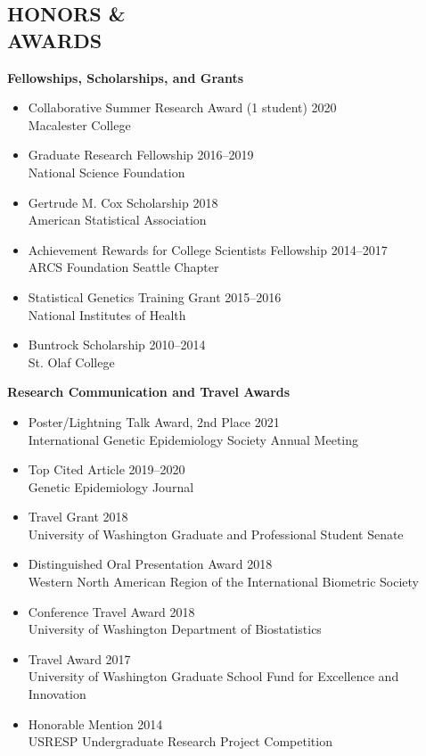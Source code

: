 \documentclass[margin]{res}
\begin{document}
\begin{resume}
					
\section{HONORS \& \\ AWARDS}

\textbf{Fellowships, Scholarships, and Grants}
\begin{itemize}
\item Collaborative Summer Research Award (1 student) \hfill 2020 \\
Macalester College
\item Graduate Research Fellowship \hfill 2016--2019 \\
National Science Foundation  
\item Gertrude M. Cox Scholarship \hfill 2018 \\ American Statistical Association
\item Achievement Rewards for College Scientists Fellowship \hfill 2014--2017 \\
ARCS Foundation Seattle Chapter
\item Statistical Genetics Training Grant \hfill 2015--2016  \\
National Institutes of Health 
\item Buntrock Scholarship \hfill 2010--2014 \\ St. Olaf College \\
\end{itemize}

\textbf{Research Communication and Travel Awards}
\begin{itemize}
\item Poster/Lightning Talk Award, 2nd Place \hfill 2021 \\
International Genetic Epidemiology Society Annual Meeting
\item Top Cited Article  \hfill 2019--2020 \\
Genetic Epidemiology Journal
\item Travel Grant \hfill 2018 \\ University of Washington Graduate and Professional Student Senate
\item Distinguished Oral Presentation Award  \hfill 2018 \\ Western North American Region of the International Biometric Society  %
\item Conference Travel Award \hfill 2018 \\
University of Washington Department of Biostatistics
\item Travel Award \hfill 2017 \\
University of Washington Graduate School Fund for Excellence and Innovation
\item Honorable Mention \hfill 2014 \\ 
USRESP Undergraduate Research Project Competition \\
\end{itemize}


\end{resume}
\end{document}
